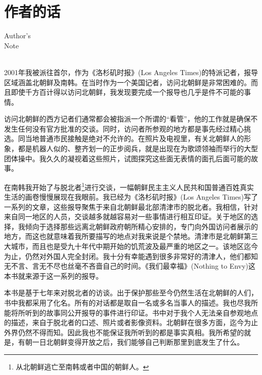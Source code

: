\chapter*{作者的话}
\vspace{5mm}
\begin{flushright}
	\textcolor{PinYinColor}{\EN \huge{Author's\\
			Note\\
			\ \\}}
\end{flushright}

2001年我被派往首尔，作为《洛杉矶时报》(Los Angeles Times)的特派记者，报导区域涵盖北朝鲜及南韩。在当时作为一个美国记者，访问北朝鲜是非常困难的。而且即使千方百计得以访问北朝鲜，我发现要完成一个报导也几乎是件不可能的事情。

访问北朝鲜的西方记者们通常都会被指派一个所谓的“看管”，他的工作就是确保不发生任何没有官方批准的交谈。同时，访问者所参观的地方都是事先经过精心挑选。同当地普通市民接触是绝对不允许的。在照片及电视里，有关北朝鲜人的形象，都是机器人似的、整齐划一的正步阅兵，就是出现在为歌颂领袖而举行的大型团体操中。我久久的凝视着这些照片，试图探究这些面无表情的面孔后面可能的故事。

在南韩我开始了与脱北者\footnote{从北朝鲜逃亡至南韩或者中国的朝鲜人。}进行交谈，一幅朝鲜民主主义人民共和国普通百姓真实生活的画卷慢慢展现在我眼前。我已经为《洛杉矶时报》(Los Angeles Times)写了一系列的文章，这些报导聚焦于来自北朝鲜最北部清津市的脱北者。我相信，针对来自同一地区的人员，交谈越多就越容易对一些事情进行相互印证。关于地区的选择，我倾向于选择那些远离北朝鲜政府朝所精心安排的，专门向外国访问者展示的地方，而这也就意味着我所要描写的地点对我来说是个禁地。清津市是北朝鲜第三大城市，而且也是受九十年代中期开始的饥荒波及最严重的地区之一。该地区迄今为止，仍然对外国人完全封闭。我十分有幸能遇到很多非常好的清津人，他们都知无不言、言无不尽也丝毫不吝啬自己的时间。《我们最幸福》(Nothing to Envy)这本书就来源于这一系列的报导。

本书是基于七年来对脱北者的访谈。出于保护那些至今仍然生活在北朝鲜的人们，书中我都采用了化名。所有的对话都是取自一名或多名当事人的描述。我也尽我所能将所听到的故事同公开报导的事件进行印证。书中对于我个人无法亲自参观地点的描述，来自于脱北者的口述、照片或者影像资料。北朝鲜在很多方面，迄今为止外界仍然不得而知。因此我也不能保证我所听到的都是事实真相。我所希望的就是，有朝一日北朝鲜变得开放之后，我们能够自己判断那里到底发生了什么。
